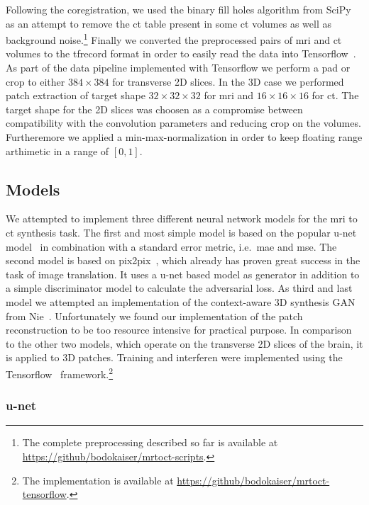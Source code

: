 Following the coregistration, we used the binary fill holes algorithm from
SciPy~\cite{SciPy} as an attempt to remove the \gls{ct} table present in some
\gls{ct} volumes as well as background noise.\footnote{The complete
preprocessing described so far is available at
\url{https://github/bodokaiser/mrtoct-scripts}.} Finally we converted the
preprocessed pairs of \gls{mri} and \gls{ct} volumes to the tfrecord format
in order to easily read the data into Tensorflow~\cite{Tensorflow15}. As part
of the data pipeline implemented with Tensorflow we perform a pad or crop to
either $384\times384$ for transverse 2D slices. In the 3D case we performed
patch extraction of target shape $32\times32\times32$ for \gls{mri} and
$16\times16\times16$ for \gls{ct}. The target shape for the 2D slices was
choosen as a compromise between compatibility with the convolution parameters
and reducing crop on the volumes. Furtheremore we applied a
min-max-normalization in order to keep floating range arthimetic in a range
of $[0,1]$.

\subsection{Models}

We attempted to implement three different neural network models for the
\gls{mri} to \gls{ct} synthesis task. The first and most simple model is based
on the popular u-net model~\cite{Ronneberger15} in combination with a
standard error metric, i.e.\ \gls{mae} and \gls{mse}. The second model is
based on pix2pix~\cite{Isola16}, which already has proven great success in the
task of image translation. It uses a u-net based model as generator in
addition to a simple discriminator model to calculate the adversarial loss. As
third and last model we attempted an implementation of the context-aware 3D
synthesis GAN from Nie~\cite{Nie16}. Unfortunately we found our implementation
of the patch reconstruction to be too resource intensive for practical
purpose. In comparison to the other two models, which operate on the
transverse 2D slices of the brain, it is applied to 3D patches. Training and
interferen were implemented using the Tensorflow~\cite{Tensorflow15}
framework.\footnote{The implementation is available at
\url{https://github/bodokaiser/mrtoct-tensorflow}.}

\subsubsection{u-net}


